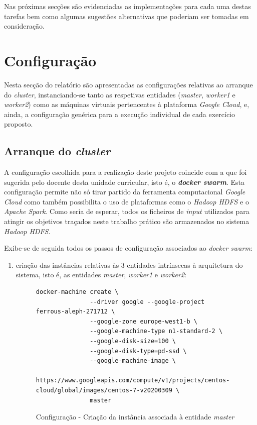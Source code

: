 \documentclass[a4paper]{report}
\begin{document}
{    Nas próximas secções são evidenciadas as implementações para cada uma destas tarefas bem como algumas sugestões alternativas que poderiam ser tomadas em consideração.

    \section{Configuração} \label{sec:Configuration}
        Nesta secção do relatório são apresentadas as configurações relativas ao arranque do \textit{cluster}, instanciando-se tanto as respetivas entidades (\textsl{master}, \textsl{worker1} e \textsl{worker2}) como as máquinas virtuais pertencentes à plataforma \textit{Google Cloud}, e, ainda, a configuração genérica para a execução individual de cada exercício proposto. 

        \subsection{Arranque do \textit{cluster}} \label{subsec:Configuration-Cluster}
            A configuração escolhida para a realização deste projeto coincide com a que foi sugerida pelo docente desta unidade curricular, isto é, o \textbf{\textit{docker swarm}}.
            Esta configuração permite não só tirar partido da ferramenta computacional \textit{Google Cloud} como também possibilita o uso de plataformas como o \textit{Hadoop HDFS} e o \textit{Apache Spark}.
            Como seria de esperar, todos os ficheiros de \textit{input} utilizados para atingir os objetivos traçados neste trabalho prático são armazenados no sistema \textit{Hadoop HDFS}.
            
            Exibe-se de seguida todos os passos de configuração associados ao \textit{docker swarm}:
            \begin{enumerate}[label=\textbf{\arabic*.}]
                \item criação das instâncias relativas às 3 entidades intrínsecas à arquitetura do sistema, isto é, as entidades \textsl{master}, \textsl{worker1} e \textsl{worker2}:
                \begin{figure}[H]
                    \centering
                    \begin{verbatim}
docker-machine create \
               --driver google --google-project ferrous-aleph-271712 \
               --google-zone europe-west1-b \
               --google-machine-type n1-standard-2 \
               --google-disk-size=100 \
               --google-disk-type=pd-ssd \
               --google-machine-image \
       https://www.googleapis.com/compute/v1/projects/centos-cloud/global/images/centos-7-v20200309 \
               master
                    \end{verbatim}
                    \vspace{-5mm}
                    \caption{Configuração - Criação da instância associada à entidade \textsl{master}}
                    \label{fig:1}
                \end{figure}
                

\end{enumerate}}
\end{document}
